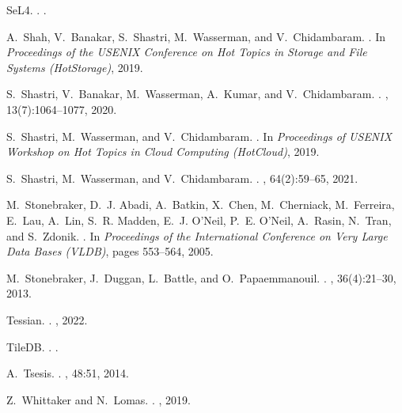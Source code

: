 \documentclass[11pt,dvipdfmx]{article}
\begin{document}
\begin{thebibliography}{10}
\begin{small}
  SeL4.
  .
  .
  
  A.~Shah, V.~Banakar, S.~Shastri, M.~Wasserman, and V.~Chidambaram.
  .
  \newblock In {\em Proceedings of the USENIX Conference on Hot Topics in Storage
    and File Systems (HotStorage)}, 2019.
  
  S.~Shastri, V.~Banakar, M.~Wasserman, A.~Kumar, and V.~Chidambaram.
  .
  , 13(7):1064--1077, 2020.
  
  S.~Shastri, M.~Wasserman, and V.~Chidambaram.
  .
  \newblock In {\em Proceedings of USENIX Workshop on Hot Topics in Cloud
    Computing (HotCloud)}, 2019.
  
  S.~Shastri, M.~Wasserman, and V.~Chidambaram.
  .
  , 64(2):59--65, 2021.
  
  M.~Stonebraker, D.~J. Abadi, A.~Batkin, X.~Chen, M.~Cherniack, M.~Ferreira,
    E.~Lau, A.~Lin, S.~R. Madden, E.~J. O'Neil, P.~E. O'Neil, A.~Rasin, N.~Tran,
    and S.~Zdonik.
  .
  \newblock In {\em Proceedings of the International Conference on Very Large
    Data Bases (VLDB)}, pages 553--564, 2005.
  
  M.~Stonebraker, J.~Duggan, L.~Battle, and O.~Papaemmanouil.
  .
  , 36(4):21--30, 2013.
  
  Tessian.
  .
  , 2022.
  
  TileDB.
  .
  .
  
  A.~Tsesis.
  .
  , 48:51, 2014.
  
  Z.~Whittaker and N.~Lomas.
  .
  ,
    2019.
  

\end{small}
\end{thebibliography}
\end{document}
